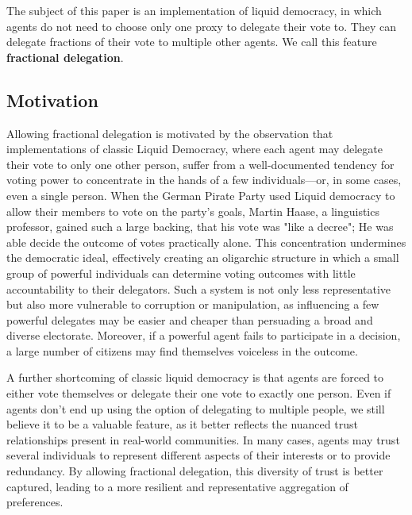 The subject of this paper is an implementation of liquid democracy, in which agents do not need to choose only one proxy to delegate their vote to. They can delegate fractions of their vote to multiple other agents. We call this feature \textbf{fractional delegation}. 

\subsection{Motivation}
\label{subsec:motivation}

Allowing fractional delegation is motivated by the observation that implementations of classic Liquid Democracy, where each agent may delegate their vote to only one other person, suffer from a well-documented tendency for voting power to concentrate in the hands of a few individuals—or, in some cases, even a single person. \cite{klingVotingBehaviourPower2015, caragiannisContributionCritiqueLiquid2019, beckerWhenCanLiquid2021} When the German Pirate Party used Liquid democracy to allow their members to vote on the party's goals, Martin Haase, a linguistics professor, gained such a large backing, that his vote was "like a decree"; He was able decide the outcome of votes practically alone. \cite{beckerWebPlatformMakes2012} This concentration undermines the democratic ideal, effectively creating an oligarchic structure in which a small group of powerful individuals can determine voting outcomes with little accountability to their delegators. Such a system is not only less representative but also more vulnerable to corruption or manipulation, as influencing a few powerful delegates may be easier and cheaper than persuading a broad and diverse electorate. Moreover, if a powerful agent fails to participate in a decision, a large number of citizens may find themselves voiceless in the outcome.

A further shortcoming of classic liquid democracy is that agents are forced to either vote themselves or delegate their one vote to exactly one person. Even if agents don't end up using the option of delegating to multiple people, we still believe it to be a valuable feature, as it better reflects the nuanced trust relationships present in real-world communities. In many cases, agents may trust several individuals to represent different aspects of their interests or to provide redundancy. By allowing fractional delegation, this diversity of trust is better captured, leading to a more resilient and representative aggregation of preferences. 

